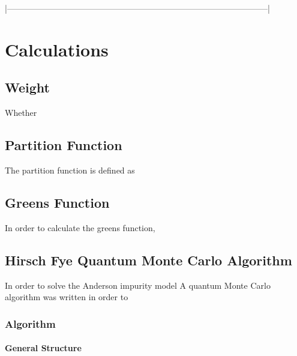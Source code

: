 |———————————————————————————————|


\section{Calculations}

\subsection{Weight}
Whether

\subsection{Partition Function}
The partition function is defined as

\subsection{Greens Function}
In order to calculate the greens function,

\subsection{Hirsch Fye Quantum Monte Carlo Algorithm}

In order to solve the Anderson impurity model
A quantum Monte Carlo algorithm was written in order to

\subsubsection{Algorithm}

\paragraph{General Structure}

